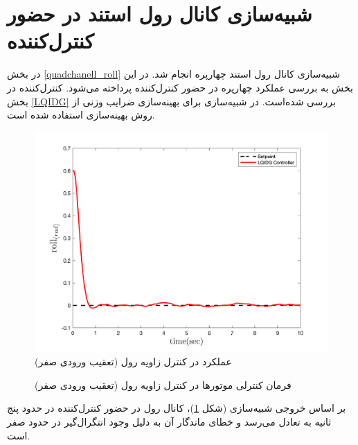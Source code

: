 \section{شبیه‌سازی کانال رول استند در حضور کنترل‌کننده }\label{roll_lqidg_section_simulation}
در بخش
\ref{quadchanell_roll}
شبیه‌سازی کانال رول استند چهارپره انجام شد. در این بخش به بررسی عملکرد چهارپره در حضور کنترل‌کننده  پرداخته می‌شود. کنترل‌کننده  در بخش
\ref{LQIDG}
بررسی شده‌است.
 در شبیه‌سازی برای بهینه‌سازی ضرایب وزنی  از روش بهینه‌سازی
 \cite{Karimi2010}
استفاده شده است.
\begin{figure}[H]
	\includegraphics[width=.48\linewidth]{../Figures/MIL/LQIDG/Roll/lqidg_roll.png}
	\centering
	\caption{عملكرد  در کنترل زاويه رول (تعقیب ورودی صفر)}
	\label{lqidg_roll_fig_simulation}
\end{figure}
\begin{figure}[H]
	\centering
	\caption{‫‪فرمان کنترلی موتورها در کنترل زاویه رول (تعقیب ورودی صفر)}
\end{figure}

بر اساس خروجی شبیه‌سازی (شکل
\ref{lqidg_roll_fig_simulation})،
کانال رول در حضور کنترل‌کننده  در حدود پنج ثانیه به تعادل می‌رسد و خطای ماندگار آن به دلیل وجود انتگرال‌گیر در حدود صفر است.